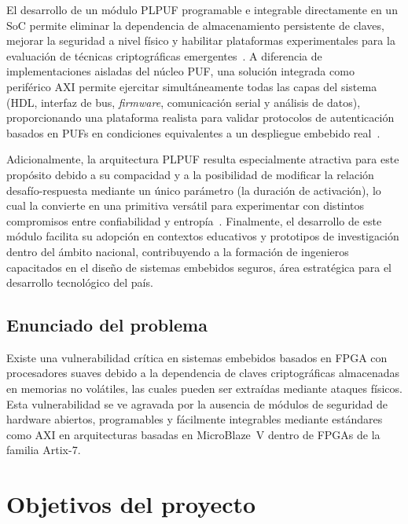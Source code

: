 El desarrollo de un módulo PLPUF programable e integrable directamente en un
SoC permite eliminar la dependencia de almacenamiento persistente de
claves, mejorar la seguridad a nivel físico y habilitar plataformas
experimentales para la evaluación de técnicas criptográficas
emergentes~\cite{delvaux_2015_helper, farha_2019_physical}. A diferencia de
implementaciones aisladas del núcleo PUF, una solución integrada como
periférico AXI permite ejercitar simultáneamente todas las capas del sistema
(HDL, interfaz de bus, \textit{firmware}, comunicación serial y análisis de
datos), proporcionando una plataforma realista para validar protocolos de
autenticación basados en PUFs en condiciones equivalentes a un despliegue
embebido real~\cite{idriss_2021_lightweight, hou_2023_modeling}.

Adicionalmente, la arquitectura PLPUF resulta especialmente atractiva para
este propósito debido a su compacidad y a la posibilidad de modificar la
relación desafío-respuesta mediante un único parámetro (la duración de
activación), lo cual la convierte en una primitiva versátil para experimentar
con distintos compromisos entre confiabilidad y
entropía~\cite{hori_2011_pseudolfsr, alsharkawy_2024_plpufs}. Finalmente, el
desarrollo de este módulo facilita su adopción en contextos educativos y
prototipos de investigación dentro del ámbito nacional, contribuyendo a la
formación de ingenieros capacitados en el diseño de sistemas embebidos
seguros, área estratégica para el desarrollo tecnológico del país.

\subsection{Enunciado del problema}

Existe una vulnerabilidad crítica en sistemas embebidos basados en FPGA con procesadores
suaves debido a la dependencia de claves criptográficas almacenadas en memorias no
volátiles, las cuales pueden ser extraídas mediante ataques físicos. Esta vulnerabilidad
se ve agravada por la ausencia de módulos de seguridad de hardware abiertos,
programables y fácilmente integrables mediante estándares como AXI en arquitecturas
basadas en MicroBlaze~V dentro de FPGAs de la familia Artix-7.


\section{Objetivos del proyecto}

